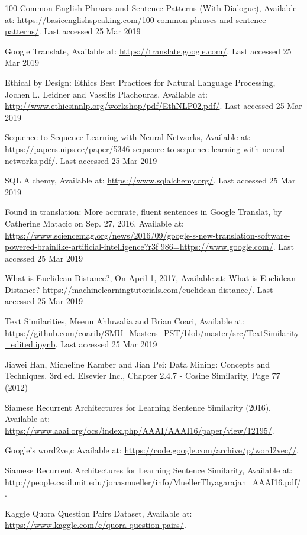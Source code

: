 \documentclass[runningheads]{llncs}
\begin{document}
\begin{thebibliography}{8}
	100 Common English Phrases and Sentence Patterns (With Dialogue), Available at: \url{https://basicenglishspeaking.com/100-common-phrases-and-sentence-patterns/}.  Last accessed 25 Mar 2019

	Google Translate, Available at: \url{https://translate.google.com/}.  Last accessed 25 Mar 2019

	Ethical by Design: Ethics Best Practices for Natural Language Processing, Jochen L. Leidner and Vassilis Plachouras, Available at: \url{http://www.ethicsinnlp.org/workshop/pdf/EthNLP02.pdf/}.  Last accessed 25 Mar 2019

Sequence to Sequence Learning with Neural Networks, Available at: \url{https://papers.nips.cc/paper/5346-sequence-to-sequence-learning-with-neural-networks.pdf/}.  Last accessed 25 Mar 2019

SQL Alchemy, Available at: \url{https://www.sqlalchemy.org/}.  Last accessed 25 Mar 2019

Found in translation: More accurate, fluent sentences in Google Translat, by Catherine Matacic on Sep. 27, 2016,  Available at:  \url{https://www.sciencemag.org/news/2016/09/google-s-new-translation-software-powered-brainlike-artificial-intelligence?r3f 986=https://www.google.com/}.  Last accessed 25 Mar 2019

What is Euclidean Distance?, On April 1, 2017, Available at:  \url{What is Euclidean Distance?  https://machinelearningtutorials.com/euclidean-distance/}.  Last accessed 25 Mar 2019

Text Similarities, Meenu Ahluwalia and Brian Coari, Available at:  \url{https://github.com/coarib/SMU_Masters_PST/blob/master/src/TextSimilarity_edited.ipynb}.  Last accessed 25 Mar 2019

Jiawei Han, Micheline Kamber and Jian Pei: Data Mining: Concepts and Techniques. 3rd ed. Elsevier Inc., Chapter 2.4.7 - Cosine Similarity, Page 77 (2012)

Siamese Recurrent Architectures for Learning Sentence Similarity (2016), Available at:
\url{https://www.aaai.org/ocs/index.php/AAAI/AAAI16/paper/view/12195/}.

Google's word2ve,c Available at:
\url{https://code.google.com/archive/p/word2vec//}.

Siamese Recurrent Architectures for Learning Sentence Similarity, Available at:
\url{http://people.csail.mit.edu/jonasmueller/info/MuellerThyagarajan_AAAI16.pdf/}.

Kaggle Quora Question Pairs  Dataset, Available at: 
\url{https://www.kaggle.com/c/quora-question-pairs/}.


\end{thebibliography}
\end{document}
